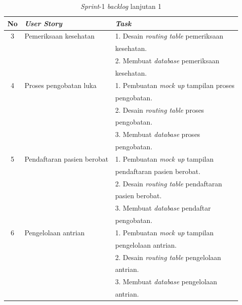 \begin{table}[H]
	\centering
	\caption{\emph{Sprint}-1 \emph{backlog} lanjutan 1}
	\label{tabel_input}
	\begin{tabular}{|c|l|l|}
		\hline
		\textbf{No} & \textbf{\emph{User Story}} & \textbf{\emph{Task}} \\
		\hline
		
		3 & 
		Pemeriksaan kesehatan&
		1. Desain \emph{routing table} pemeriksaan\\
		
		& 
		& 
		kesehatan.\\
		
		& 
		& 
		2. Membuat \emph{database} pemeriksaan\\
		
		& 
		& 
		kesehatan.\\
		\hline
		
		4 & 
		Proses pengobatan luka&
		1. Pembuatan \emph{mock up} tampilan proses\\
		
		& 
		& 
		pengobatan.\\
		
		& 
		& 
		2. Desain \emph{routing table} proses\\
		
		& 
		& 
		pengobatan.\\
		
		& 
		& 
		3. Membuat \emph{database} proses\\
		
		& 
		& 
		pengobatan.\\
		\hline
		
		5 & 
		Pendaftaran pasien berobat & 
		1. Pembuatan \emph{mock up} tampilan \\
		
		& 
		& 
		pendaftaran pasien berobat.\\
		
		& 
		& 
		2. Desain \emph{routing table} pendaftaran\\
		
		& 
		& 
		pasien berobat.\\
		
		& 
		& 
		3. Membuat \emph{database} pendaftar\\
		
		& 
		& 
		pengobatan.\\
		\hline
		
		6 & 
		Pengelolaan antrian & 
		1. Pembuatan \emph{mock up} tampilan \\
		
		& 
		& 
		pengelolaan antrian.\\
		
		& 
		& 
		2. Desain \emph{routing table} pengelolaan\\
		
		& 
		& 
		antrian.\\
		
		& 
		& 
		3. Membuat \emph{database} pengelolaan\\
		
		& 
		& 
		antrian.\\
		\hline
		
	\end{tabular}
\end{table}

